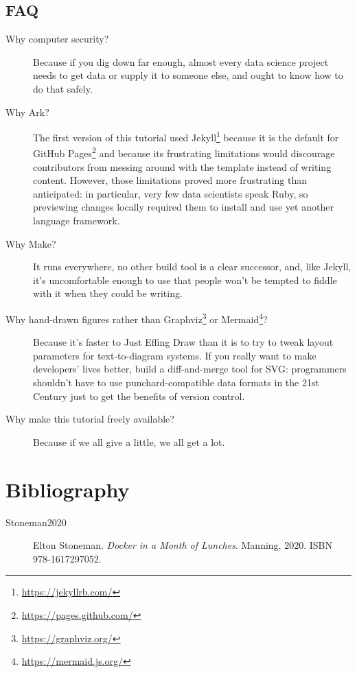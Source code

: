 \documentclass[krantzl]{krantz}
\newcommand{\hreffoot}[2]{{#1}\footnote{\href{#2}{#2}}}
\begin{document}
\section{FAQ}
\begin{description}

\item[Why computer security?] 
Because if you dig down far enough,
almost every data science project needs to get data or supply it to someone else,
and ought to know how to do that safely.

\item[Why Ark?] 
The first version of this tutorial used \hreffoot{Jekyll}{https://jekyllrb.com/}
because it is the default for \hreffoot{GitHub Pages}{https://pages.github.com/}
and because its frustrating limitations would discourage contributors
from messing around with the template instead of writing content.
However,
those limitations proved more frustrating than anticipated:
in particular,
very few data scientists speak Ruby,
so previewing changes locally required them to install and use
yet another language framework.

\item[Why Make?] 
It runs everywhere,
no other build tool is a clear successor,
and,
like Jekyll,
it’s uncomfortable enough to use that people won’t be tempted to fiddle with it
when they could be writing.

\item[Why hand-drawn figures rather than \hreffoot{Graphviz}{https://graphviz.org/} or \hreffoot{Mermaid}{https://mermaid.js.org/}?] 
Because it’s faster to Just Effing Draw than it is
to try to tweak layout parameters for text-to-diagram systems.
If you really want to make developers’ lives better,
build a diff-and-merge tool for SVG:
programmers shouldn’t have to use punchard-compatible data formats in the 21st Century
just to get the benefits of version control.

\item[Why make this tutorial freely available?] 
Because if we all give a little, we all get a lot.

\end{description}

\chapter{Bibliography}\label{bib}



\begin{description}

\item[Stoneman2020] 
Elton Stoneman.
\emph{Docker in a Month of Lunches}.
Manning, 2020.
ISBN 978-1617297052.

\end{description}
\end{document}

